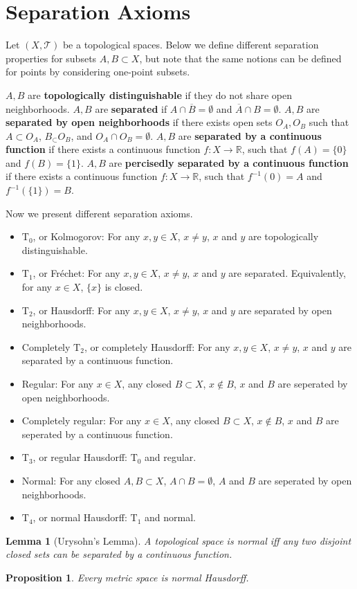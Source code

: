 \documentclass[openany]{book}
\newtheorem{lemma}{Lemma}[chapter]
\newtheorem{proposition}{Proposition}[chapter]
\theoremstyle{definition}
\theoremstyle{remark}
\begin{document}
\section{Separation Axioms}
Let $(X,\mathcal{T})$ be a topological spaces. Below we define different separation properties for subsets $A,B\subset X$, but note that the same notions can be defined for points by considering one-point subsets.

$A,B$ are \textbf{topologically distinguishable} if they do not share open neighborhoods. $A,B$ are \textbf{separated} if $A\cap\overline{B}=\emptyset$ and $\overline{A}\cap B=\emptyset$. $A,B$ are \textbf{separated by open neighborhoods} if there exists open sets $O_A,O_B$ such that $A\subset O_A$, $B_\subset O_B$, and $O_A\cap O_B=\emptyset$. $A,B$ are \textbf{separated by a continuous function} if there exists a continuous function $f:X\to \mathbb{R}$, such that $f(A)=\{0\}$ and $f(B)=\{1\}$. $A,B$ are \textbf{percisedly separated by a continuous function} if there exists a continuous function $f:X\to \mathbb{R}$, such that $f^{-1}({0})=A$ and $f^{-1}(\{1\})=B$.

Now we present different separation axioms.
\begin{itemize}
    \item $\mathrm{T}_0$, or Kolmogorov: For any $x,y\in X$, $x\ne y$, $x$ and $y$ are topologically distinguishable.
    \item $\mathrm{T}_1$, or Fr\'{e}chet: For any $x,y\in X$, $x\ne y$, $x$ and $y$ are separated. Equivalently, for any $x\in X$, $\{x\}$ is closed.
    \item $\mathrm{T}_2$, or Hausdorff: For any $x,y\in X$, $x\ne y$, $x$ and $y$ are separated by open neighborhoods.
    \item Completely $\mathrm{T}_2$, or completely Hausdorff: For any $x,y\in X$, $x\ne y$, $x$ and $y$ are separated by a continuous function.
    \item Regular: For any $x\in X$, any closed $B\subset X$, $x\not\in B$, $x$ and $B$ are seperated by open neighborhoods.
    \item Completely regular: For any $x\in X$, any closed $B\subset X$, $x\not\in B$, $x$ and $B$ are seperated by a continuous function.
    \item $\mathrm{T}_3$, or regular Hausdorff: $\mathrm{T}_0$ and regular.
    \item Normal: For any closed $A,B\subset X$, $A\cap B=\emptyset$, $A$ and $B$ are seperated by open neighborhoods.
    \item $\mathrm{T}_4$, or normal Hausdorff: $\mathrm{T}_1$ and normal.
\end{itemize}
\begin{lemma}[Urysohn's Lemma]
    A topological space is normal iff any two disjoint closed sets can be separated by a continuous function.
\end{lemma}
\begin{proposition}
    Every metric space is normal Hausdorff.
\end{proposition}
\end{document}
